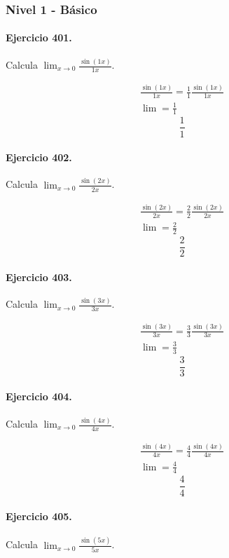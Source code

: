 \documentclass[11pt,a4paper]{article}
\begin{document}
\subsubsection*{Nivel 1 - Básico}

\paragraph{Ejercicio 401.} Calcula $\displaystyle\lim_{x\to0}\frac{\sin(1x)}{1x}$.

\[
\begin{aligned}
\frac{\sin(1x)}{1x}=\frac{1}{1}\frac{\sin(1x)}{1x}\\
\lim=\frac{1}{1}
\end{aligned}
\]
\[\boxed{\frac{1}{1}}\]


\paragraph{Ejercicio 402.} Calcula $\displaystyle\lim_{x\to0}\frac{\sin(2x)}{2x}$.

\[
\begin{aligned}
\frac{\sin(2x)}{2x}=\frac{2}{2}\frac{\sin(2x)}{2x}\\
\lim=\frac{2}{2}
\end{aligned}
\]
\[\boxed{\frac{2}{2}}\]


\paragraph{Ejercicio 403.} Calcula $\displaystyle\lim_{x\to0}\frac{\sin(3x)}{3x}$.

\[
\begin{aligned}
\frac{\sin(3x)}{3x}=\frac{3}{3}\frac{\sin(3x)}{3x}\\
\lim=\frac{3}{3}
\end{aligned}
\]
\[\boxed{\frac{3}{3}}\]


\paragraph{Ejercicio 404.} Calcula $\displaystyle\lim_{x\to0}\frac{\sin(4x)}{4x}$.

\[
\begin{aligned}
\frac{\sin(4x)}{4x}=\frac{4}{4}\frac{\sin(4x)}{4x}\\
\lim=\frac{4}{4}
\end{aligned}
\]
\[\boxed{\frac{4}{4}}\]


\paragraph{Ejercicio 405.} Calcula $\displaystyle\lim_{x\to0}\frac{\sin(5x)}{5x}$.
\end{document}
